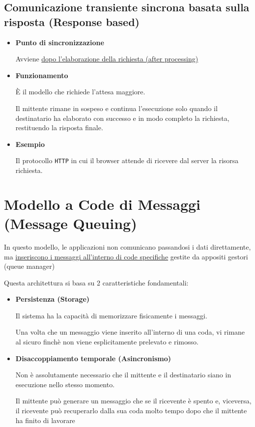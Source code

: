 \subsection{Comunicazione transiente sincrona basata sulla risposta (Response based)}
\begin{itemize}
    \item \textbf{Punto di sincronizzazione}

    Avviene \uline{dopo l'elaborazione della richiesta (after processing)}

    \item \textbf{Funzionamento}

    È il modello che richiede l'attesa maggiore.

    Il mittente rimane in sospeso e continua l'esecuzione solo quando il destinatario ha elaborato con successo e in modo completo la richiesta, restituendo la risposta finale.

    \item \textbf{Esempio}

    Il protocollo \texttt{HTTP} in cui il browser attende di ricevere dal server la risorsa richiesta.
\end{itemize}

\section{Modello a Code di Messaggi (Message Queuing)}
In questo modello, le applicazioni non comunicano passandosi i dati direttamente, ma \uline{inseriscono i messaggi all'interno di code specifiche} gestite da appositi gestori (queue manager)

Questa architettura si basa su 2 caratteristiche fondamentali:
\begin{itemize}
    \item \textbf{Persistenza (Storage)}

    Il sistema ha la capacità di memorizzare fisicamente i messaggi.

    Una volta che un messaggio viene inserito all'interno di una coda, vi rimane al sicuro finchè non viene esplicitamente prelevato e rimosso.

    \item \textbf{Disaccoppiamento temporale (Asincronismo)}

    Non è assolutamente necessario che il mittente e il destinatario siano in esecuzione nello stesso momento.

    Il mittente può generare un messaggio che se il ricevente è spento e, viceversa, il ricevente può recuperarlo dalla sua coda molto tempo dopo che il mittente ha finito di lavorare
\end{itemize}

